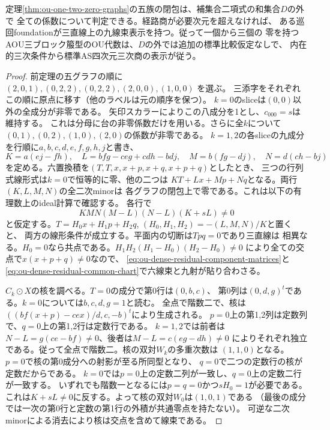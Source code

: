 \begin{theorem}[補集合二項式外の全特殊化]
\label{thm:ou-one-two-zero-all-boundaries}
定理\ref{thm:ou-one-two-zero-graphs}の五族の閉包は、補集合二項式の和集合$D$の外で
全ての係数について判定できる。経路商が必要次元を超えなければ、
ある巡回foundationが三直線上の九線束表示を持つ。従って一個から三個の
零を持つAOU三ブロック箙型のOU代数は、$D$の外では追加の標準比較仮定なしで、
内在的三次条件から標準AS四次元三次商の表示が従う。
\end{theorem}
\begin{proof}
前定理の五グラフの順に $(2,0,1),(0,2,2),(0,2,2),(2,0,0),(1,0,0)$ を選ぶ。
三添字をそれぞれこの順に原点に移す（他のラベルは元の順序を保つ）。
$k=0$のsliceは$(0,0)$以外の全成分が非零である。
矢印スカラーによりこの八成分を1とし、$c_{000}=s$は維持する。
これは分母に台の非零係数だけを用いる。さらに全$k$について
$(0,1),(0,2),(1,0),(2,0)$の係数が非零である。
$k=1,2$の各sliceの九成分を行順に$a,b,c,d,e,f,g,h,j$と書き、
\[
 K=a(ej-fh),\quad L=bfg-ceg+cdh-bdj,\quad
 M=b(fg-dj),\quad N=d(ch-bj)
\]
を定める。六置換積を$(T,T,x,x+p,x+q,x+p+q)$としたとき、
三つの行列式線形式は$k=0$で恒等的に零、他の二つは
$KT+Lx+Mp+Nq$となる。両行$(K,L,M,N)$の全二次minorは
各グラフの閉包上で零である。これは以下の有理数上のideal計算で確認する。
各行で
\[
 K M N(M-L)(N-L)(K+sL)\ne0
 \tag{$*$}\label{eq:ou-cyclic-triangle-chart}
\]
と仮定する。$T=H_0x+H_1p+H_2q$, $(H_0,H_1,H_2)=-(L,M,N)/K$と置くと、
両方の線形条件が成立する。平面内の切断は$Tpq=0$であり三直線は
相異なる。$H_0=0$なら共点である。$H_1H_2(H_1-H_0)(H_2-H_0)\ne0$
により全ての交点で$x(x+p+q)\ne0$なので、
\eqref{eq:ou-dense-residual-component-matrices}と
\eqref{eq:ou-dense-residual-common-chart}で六線束と九射が貼り合わさる。

$C_k\odot X$の核を調べる。$T=0$の成分で第0行は$(0,b,c)$、
第0列は$(0,d,g)^t$である。$k=0$については$b,c,d,g=1$と読む。
全点で階数二で、核は$((bf(x+p)-cex)/d,c,-b)^t$により生成される。
$p=0$上の第1,2列は定数列で、$q=0$上の第1,2行は定数行である。
$k=1,2$では前者は$N-L=g(ce-bf)\ne0$、後者は$M-L=c(eg-dh)\ne0$
によりそれぞれ独立である。従って全点で階数二。核の双対$W_k$の多重次数は
$(1,1,0)$となる。$p=0$で核の第0成分への射影が至る所同型となり、
$q=0$で二つの定数行の核が定数だからである。
$k=0$では$p=0$上の定数二列が一致し、$q=0$上の定数二行が一致する。
いずれでも階数一となるには$p=q=0$かつ$sH_0=1$が必要である。
これは$K+sL\ne0$に反する。よって核の双対$W_0$は$(1,0,1)$である
（最後の成分では一次の第0行と定数の第1行の外積が共通零点を持たない）。
可逆な二次minorによる消去により核は交点を含めて線束である。


\end{proof}
